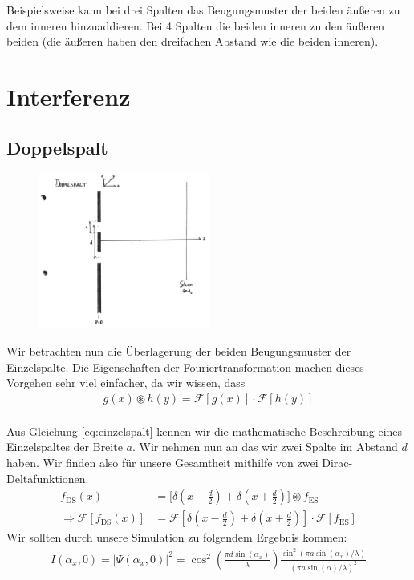 \documentclass[a4paper]{article}
\newcommand{\ff}[1]{\mathscr{F}\left[#1\right]}
\begin{document}
Beispielsweise kann bei drei Spalten das Beugungsmuster der beiden äußeren zu dem inneren hinzuaddieren. Bei 4 Spalten die beiden inneren zu den äußeren beiden (die äußeren haben den dreifachen Abstand wie die beiden inneren).
\section{Interferenz}
\subsection{Doppelspalt}
\begin{figure}[!htb]
\centering

\includegraphics[width=0.5\textwidth]{doppelspalt.pdf}
\end{figure}
Wir betrachten nun die Überlagerung der beiden Beugungsmuster der Einzelspalte. Die Eigenschaften der Fouriertransformation machen dieses Vorgehen sehr viel einfacher, da wir wissen, dass
\begin{align}
g(x) \circledast h(y) = \mathscr{F}[g(x)] \cdot \mathscr{F}[h(y)] \\
\end{align}

Aus Gleichung \ref{eq:einzelspalt} kennen wir die mathematische Beschreibung eines Einzelspaltes der Breite $a$. Wir nehmen nun an das wir zwei Spalte im Abstand $d$ haben. Wir finden also für unsere Gesamtheit mithilfe von zwei Dirac-Deltafunktionen.
\begin{align}
f_{\text{DS}}(x) &= \Bigg[ \delta\left(x-\frac{d}{2}\right) + \delta\left(x+\frac{d}{2}\right) \Bigg]  \circledast f_\text{ES} \\
\Rightarrow \ff{f_{\text{DS}}(x) } &= \ff{ \delta\left(x-\frac{d}{2}\right) + \delta\left(x+\frac{d}{2}\right)  } \cdot \ff{f_\text{ES}}
\end{align}
Wir sollten durch unsere Simulation zu folgendem Ergebnis kommen:
\begin{align}
I(\alpha_x,0) = |\Psi(\alpha_x,0)|^2 =  \cos^2 \left(\frac{\pi d \sin(\alpha_x)}{\lambda}\right) \frac{\sin^2(\pi a \sin(\alpha_x)/\lambda)}{(\pi a \sin(\alpha)/\lambda)^2}
\end{align}
\end{document}
